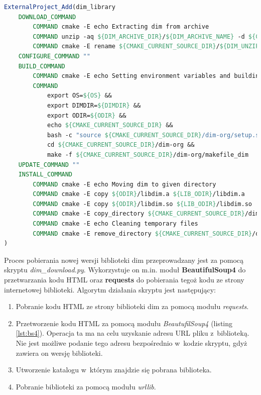 \begin{lstlisting}[language=cmake, caption={Fragment pliku \textit{CMakeLists.txt} przeznaczonego do konfiguracji procesu budowania biblioteki \gls*{dim}. Widoczne zastosowanie funkcjonalności \textit{ExternalProject} pozwalającej na wykorzystanie plików \textit{Makefile} (makefile\_dim) dostarczonych przez autorów biblioteki.}, label={lst:dimexternal}]
ExternalProject_Add(dim_library
    DOWNLOAD_COMMAND 
        COMMAND cmake -E echo Extracting dim from archive
        COMMAND unzip -aq ${DIM_ARCHIVE_DIR}/${DIM_ARCHIVE_NAME} -d ${CMAKE_CURRENT_SOURCE_DIR}
        COMMAND cmake -E rename ${CMAKE_CURRENT_SOURCE_DIR}/${DIM_UNZIP_OUTPUT_DIRECTORY} ${CMAKE_CURRENT_SOURCE_DIR}/dim-org
    CONFIGURE_COMMAND ""
    BUILD_COMMAND 
        COMMAND cmake -E echo Setting environment variables and building
        COMMAND 
            export OS=${OS} && 
            export DIMDIR=${DIMDIR} && 
            export ODIR=${ODIR} && 
            echo ${CMAKE_CURRENT_SOURCE_DIR} && 
            bash -c "source ${CMAKE_CURRENT_SOURCE_DIR}/dim-org/setup.sh" && 
            cd ${CMAKE_CURRENT_SOURCE_DIR}/dim-org && 
            make -f ${CMAKE_CURRENT_SOURCE_DIR}/dim-org/makefile_dim
    UPDATE_COMMAND ""
    INSTALL_COMMAND 
        COMMAND cmake -E echo Moving dim to given directory
        COMMAND cmake -E copy ${ODIR}/libdim.a ${LIB_ODIR}/libdim.a
        COMMAND cmake -E copy ${ODIR}/libdim.so ${LIB_ODIR}/libdim.so
        COMMAND cmake -E copy_directory ${CMAKE_CURRENT_SOURCE_DIR}/dim-org/dim ${INCLUDE_ODIR}/dim
        COMMAND cmake -E echo Cleaning temporary files
        COMMAND cmake -E remove_directory ${CMAKE_CURRENT_SOURCE_DIR}/dim-org
)
\end{lstlisting}

Proces pobierania nowej wersji biblioteki \gls*{dim} przeprowadzany jest za pomocą skryptu \textit{dim\_download.py}. Wykorzystuje on m.in. moduł \textbf{BeautifulSoup4} do przetwarzania kodu HTML oraz \textbf{requests} \cite{RequestsPython} do pobierania tegoż kodu ze strony internetowej biblioteki. Algorytm działania skryptu jest następujący:
\begin{enumerate}
\item Pobranie kodu HTML ze strony biblioteki \gls*{dim} za pomocą modułu \textit{requests}.
\item Przetworzenie kodu HTML za pomocą modułu \textit{BeautufilSoup4} (listing \ref{lst:bs4}). Operacja ta ma na celu uzyskanie adresu URL pliku z~biblioteką. Nie jest możliwe podanie tego adresu bezpośrednio w~kodzie skryptu, gdyż zawiera on wersję biblioteki. 
\item Utworzenie katalogu w~którym znajdzie się pobrana biblioteka.
\item Pobranie biblioteki za pomocą modułu \textit{urllib}.
\end{enumerate}

